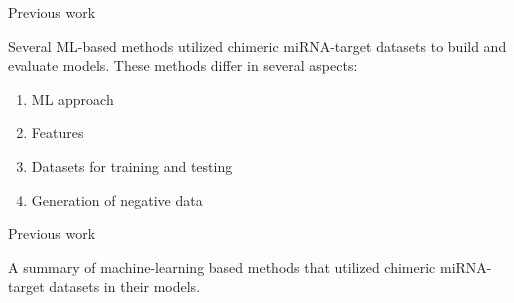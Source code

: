 \documentclass{beamer}
\begin{document}
\begin{frame}{Previous work}

Several ML-based methods utilized chimeric miRNA-target datasets to build and evaluate models. These methods differ in several aspects:
\begin{enumerate}
\item ML approach
\item Features
\item Datasets for training and testing
\item Generation of negative data
\end{enumerate}

\end{frame}


\begin{frame}{Previous work}

\begin{table}[h!]
\centering

\caption{A summary of machine-learning based methods that utilized chimeric miRNA-target datasets in their models.}
\label{tab:toolsummary}
\centering
   \resizebox{\textwidth}{!}{%

}
\end{table}
\end{frame}
\end{document}
